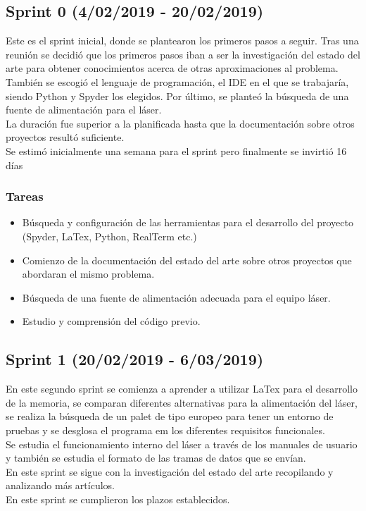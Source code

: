 \subsection{Sprint 0 (4/02/2019 - 20/02/2019)}
Este es el sprint inicial, donde se plantearon los primeros pasos a seguir. Tras una reunión se decidió que los primeros pasos iban a ser la investigación del estado del arte para obtener conocimientos acerca de otras aproximaciones al problema. También se escogió el lenguaje de programación, el IDE en el que se trabajaría, siendo Python y Spyder los elegidos. Por último, se planteó la búsqueda de una fuente de alimentación para el láser.\\ La duración fue superior a la planificada hasta que la documentación sobre otros proyectos resultó suficiente.\\ Se estimó inicialmente una semana para el sprint pero finalmente se invirtió 16 días

\subsubsection{Tareas}
\begin{itemize}
\item Búsqueda y configuración de las herramientas para el desarrollo del proyecto (Spyder, LaTex, Python, RealTerm etc.)
\item Comienzo de la documentación del estado del arte sobre otros proyectos que abordaran el mismo problema.
\item Búsqueda de una fuente de alimentación adecuada para el equipo láser.
\item Estudio y comprensión del código previo.
\end{itemize}



\subsection{Sprint 1 (20/02/2019 - 6/03/2019)}
En este segundo sprint se comienza a aprender a utilizar LaTex para el desarrollo de la memoria, se comparan diferentes alternativas para la alimentación del láser, se realiza la búsqueda de un palet de tipo europeo para tener un entorno de pruebas y se desglosa el programa em los diferentes requisitos funcionales.\\ Se estudia el funcionamiento interno del láser a través de los manuales de usuario y también se estudia el formato de las tramas de datos que se envían. \\En este sprint se sigue con la investigación del estado del arte recopilando y analizando más artículos.\\En este sprint se cumplieron los plazos establecidos.

